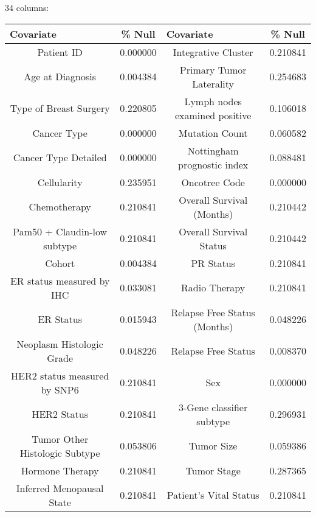 \documentclass{article}
\begin{document}
34 columns:
\begin{table}[]
\begin{tabular}{c|c||c|c}
\multicolumn{1}{l}{\textbf{Covariate}} & \% Null  & \multicolumn{1}{l}{\textbf{Covariate}} & \% Null  \\
\hline
Patient ID                             & 0.000000 & Integrative Cluster                    & 0.210841 \\
Age at Diagnosis                       & 0.004384 & Primary Tumor Laterality               & 0.254683 \\
Type of Breast Surgery                 & 0.220805 & Lymph nodes examined positive          & 0.106018 \\
Cancer Type                            & 0.000000 & Mutation Count                         & 0.060582 \\
Cancer Type Detailed                   & 0.000000 & Nottingham prognostic index            & 0.088481 \\
Cellularity                            & 0.235951 & Oncotree Code                          & 0.000000 \\
Chemotherapy                           & 0.210841 & Overall Survival (Months)              & 0.210442 \\
Pam50 + Claudin-low subtype            & 0.210841 & Overall Survival Status                & 0.210442 \\
Cohort                                 & 0.004384 & PR Status                              & 0.210841 \\
ER status measured by IHC              & 0.033081 & Radio Therapy                          & 0.210841 \\
ER Status                              & 0.015943 & Relapse Free Status (Months)           & 0.048226 \\
Neoplasm Histologic Grade              & 0.048226 & Relapse Free Status                    & 0.008370 \\
HER2 status measured by SNP6           & 0.210841 & Sex                                    & 0.000000 \\
HER2 Status                            & 0.210841 & 3-Gene classifier subtype              & 0.296931 \\
Tumor Other Histologic Subtype         & 0.053806 & Tumor Size                             & 0.059386 \\
Hormone Therapy                        & 0.210841 & Tumor Stage                            & 0.287365 \\
Inferred Menopausal State              & 0.210841 & Patient's Vital Status                 & 0.210841
\end{tabular}
\end{table}
\end{document}
